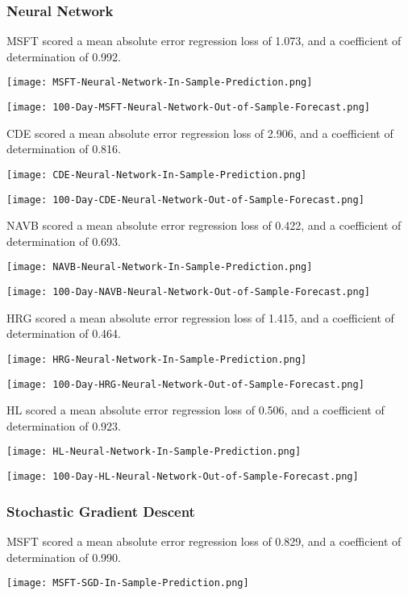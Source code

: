\subsubsection{Neural Network}
MSFT scored a mean absolute error regression loss of 1.073, and a coefficient of determination of 0.992.

\texttt{[image: MSFT-Neural-Network-In-Sample-Prediction.png]}

\texttt{[image: 100-Day-MSFT-Neural-Network-Out-of-Sample-Forecast.png]}

CDE scored a mean absolute error regression loss of 2.906, and a coefficient of determination of 0.816.

\texttt{[image: CDE-Neural-Network-In-Sample-Prediction.png]}

\texttt{[image: 100-Day-CDE-Neural-Network-Out-of-Sample-Forecast.png]}

NAVB scored a mean absolute error regression loss of 0.422, and a coefficient of determination of 0.693.

\texttt{[image: NAVB-Neural-Network-In-Sample-Prediction.png]}

\texttt{[image: 100-Day-NAVB-Neural-Network-Out-of-Sample-Forecast.png]}

HRG scored a mean absolute error regression loss of 1.415, and a coefficient of determination of 0.464.

\texttt{[image: HRG-Neural-Network-In-Sample-Prediction.png]}

\texttt{[image: 100-Day-HRG-Neural-Network-Out-of-Sample-Forecast.png]}

HL scored a mean absolute error regression loss of 0.506, and a coefficient of determination of 0.923.

\texttt{[image: HL-Neural-Network-In-Sample-Prediction.png]}

\texttt{[image: 100-Day-HL-Neural-Network-Out-of-Sample-Forecast.png]}

\subsubsection{Stochastic Gradient Descent}
MSFT scored a mean absolute error regression loss of 0.829, and a coefficient of determination of 0.990.

\texttt{[image: MSFT-SGD-In-Sample-Prediction.png]}

